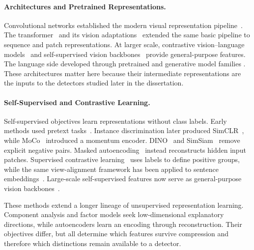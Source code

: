 \paragraph{Architectures and Pretrained Representations.}
Convolutional networks established the modern visual representation
pipeline~\citep{lecun1998gradient,krizhevsky2012imagenet,he2016deep}. The
transformer~\citep{vaswani2017attention} and its vision
adaptations~\citep{dosovitskiy2020image,Touvron2021deit} extended the same basic
pipeline to sequence and patch representations. At larger scale, contrastive
vision--language models~\citep{radford2021learning} and self-supervised vision
backbones~\citep{oquab2023dinov2} provide general-purpose features. The language
side developed through pretrained and generative model families
\citep{radford2018improving,devlin2018bert,brown2020language,raffel2020exploring}.
These architectures matter here because their intermediate representations are
the inputs to the detectors studied later in the dissertation.

\paragraph{Self-Supervised and Contrastive Learning.}
Self-supervised objectives learn representations without class labels. Early
methods used pretext tasks~\citep{gidaris2018unsupervised}. Instance
discrimination later produced SimCLR~\citep{chen2020simclr,chen2020simple}, while
MoCo~\citep{he2020momentum} introduced a momentum encoder.
DINO~\citep{Caron2021dino} and SimSiam~\citep{chen2021exploring} remove explicit
negative pairs. Masked
autoencoding~\citep{he2022masked} instead reconstructs hidden input patches.
Supervised contrastive
learning~\citep{khosla2020supervised} uses labels to define positive groups, while
the same view-alignment framework has been applied to sentence
embeddings~\citep{gao2021simcse}. Large-scale self-supervised features now serve as
general-purpose vision backbones~\citep{oquab2023dinov2}.

These methods extend a longer lineage of unsupervised representation learning.
Component analysis and factor models
\citep{pearson1901liii,hyvarinen2000independent,tipping1999probabilistic,bartholomew1987latent}
seek low-dimensional explanatory directions, while autoencoders
\citep{hinton2006reducing,vincent2008extracting,baldi2012autoencoders} learn an
encoding through reconstruction. Their objectives differ, but all determine which
features survive compression and therefore which distinctions remain available to
a detector.


